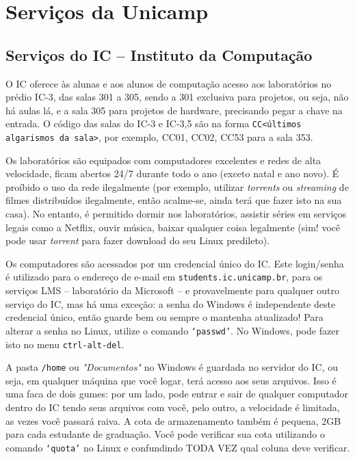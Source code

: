 
\section{Serviços da Unicamp}
\subsection{Serviços do IC -- Instituto da Computação}
\label{sec:ic_servicos}

O IC oferece às alunas e aos alunos de computação acesso aos laboratórios no
prédio IC-3, das salas 301 a 305, sendo a 301 exclusiva para projetos, ou seja,
não há aulas lá, e a sala 305 para projetos de hardware, precisando pegar a
chave na entrada. O código das salas do IC-3 e IC-3,5 são na forma
\texttt{CC<últimos algarismos da sala>}, por exemplo, CC01, CC02, CC53 para a
sala 353.

Os laboratórios são equipados com computadores excelentes e redes de alta
velocidade, ficam abertos 24/7 durante todo o ano (exceto natal e ano novo). É
proíbido o uso da rede ilegalmente (por exemplo, utilizar \emph{torrents} ou
\emph{streaming} de filmes distribuídos ilegalmente, então acalme-se, ainda
terá que fazer isto na sua casa). No entanto, é permitido dormir nos
laboratórios, assistir séries em serviços legais como a Netflix, ouvir música,
baixar qualquer coisa legalmente (sim! você pode usar \emph{torrent} para fazer
download do seu Linux predileto).

Os computadores são acessados por um credencial único do IC. Este login/senha é
utilizado para o endereço de e-mail em \texttt{students.ic.unicamp.br}, para os
serviços LMS -- laboratório da Microsoft -- e provavelmente para qualquer outro
serviço do IC, mas há uma exceção: a senha do Windows é independente deste
credencial único, então guarde bem ou sempre o mantenha atualizado! Para
alterar a senha no Linux, utilize o comando \texttt{`passwd'}. No Windows, pode
fazer isto no menu \texttt{ctrl-alt-del}.

A pasta \texttt{/home} ou \emph{"Documentos"} no Windows é guardada no servidor
do IC, ou seja, em qualquer máquina que você logar, terá acesso aos seus
arquivos. Isso é uma faca de dois gumes: por um lado, pode entrar e sair de
qualquer computador dentro do IC tendo seus arquivos com você, pelo outro, a
velocidade é limitada, as vezes você passará raiva. A cota de armazenamento
também é pequena, 2GB para cada estudante de graduação. Você pode verificar
sua cota utilizando o comando \texttt{`quota'} no Linux e confundindo TODA VEZ
qual coluna deve verificar.

